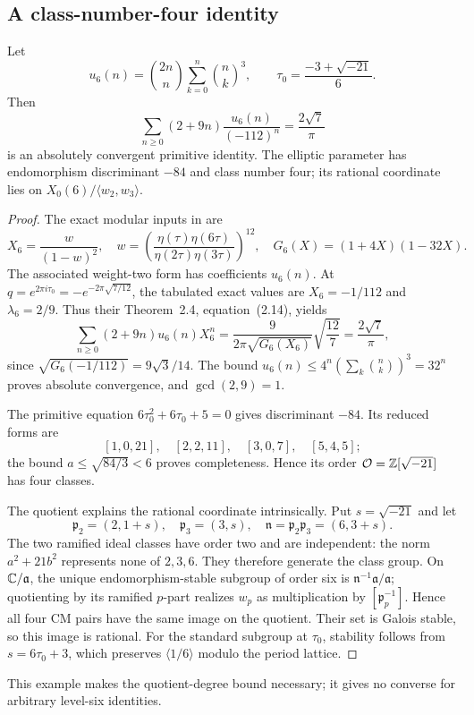 \subsection{A class-number-four identity}
\begin{proposition}\label{prop:level6-h4}
Let
\[
 u_6(n)=\binom{2n}{n}\sum_{k=0}^n\binom nk^3,
 \qquad \tau_0=\frac{-3+\sqrt{-21}}6.
\]
Then
\begin{equation}\label{eq:level6-h4}
 \sum_{n\ge0}(2+9n)\frac{u_6(n)}{(-112)^n}
          =\frac{2\sqrt7}{\pi}
\end{equation}
is an absolutely convergent primitive identity. The elliptic parameter
has endomorphism discriminant $-84$ and class number four; its rational
coordinate lies on $X_0(6)/\langle w_2,w_3\rangle$.
\end{proposition}
\begin{proof}
The exact modular inputs in \cite[Tables~2, 4, 15 and 55]{CCY} are
\[
 X_6=\frac{w}{(1-w)^2},\quad
 w=\left(\frac{\eta(\tau)\eta(6\tau)}
                   {\eta(2\tau)\eta(3\tau)}\right)^{12},\quad
 G_6(X)=(1+4X)(1-32X).
\]
The associated weight-two form has coefficients $u_6(n)$. At
$q=e^{2\pi i\tau_0}=-e^{-2\pi\sqrt{7/12}}$, the tabulated exact
values are $X_6=-1/112$ and $\lambda_6=2/9$. Thus their
Theorem~2.4, equation~(2.14), yields
\[
 \sum_{n\ge0}(2+9n)u_6(n)X_6^n
 =\frac9{2\pi\sqrt{G_6(X_6)}}\sqrt{\frac{12}7}
 =\frac{2\sqrt7}{\pi},
\]
since $\sqrt{G_6(-1/112)}=9\sqrt3/14$.
The bound $u_6(n)\le4^n(\sum_k\binom nk)^3=32^n$ proves absolute
convergence, and $\gcd(2,9)=1$.

The primitive equation $6\tau_0^2+6\tau_0+5=0$ gives discriminant
$-84$. Its reduced forms are
\[
 [1,0,21],\quad[2,2,11],\quad[3,0,7],\quad[5,4,5];
\]
the bound
$a\le\sqrt{84/3}<6$ proves completeness. Hence its order
$\mathcal O=\mathbb Z[\sqrt{-21}]$ has four classes.

The quotient explains the rational coordinate intrinsically. Put
$s=\sqrt{-21}$ and let
\[
 \mathfrak p_2=(2,1+s),\quad \mathfrak p_3=(3,s),\quad
 \mathfrak n=\mathfrak p_2\mathfrak p_3=(6,3+s).
\]
The two ramified ideal classes have order two and are independent:
the norm $a^2+21b^2$ represents none of $2,3,6$. They therefore
generate the class group. On $\mathbb C/\mathfrak a$, the unique
endomorphism-stable subgroup of order six is
$\mathfrak n^{-1}\mathfrak a/\mathfrak a$; quotienting by its
ramified $p$-part realizes $w_p$ as multiplication by
$[\mathfrak p_p^{-1}]$. Hence all four CM pairs have the same image
on the quotient. Their set is Galois stable, so this image is rational.
For the standard subgroup at $\tau_0$, stability follows from
$s=6\tau_0+3$, which preserves $\langle1/6\rangle$ modulo the period
lattice.
\end{proof}
This example makes the quotient-degree bound necessary; it gives no
converse for arbitrary level-six identities.

